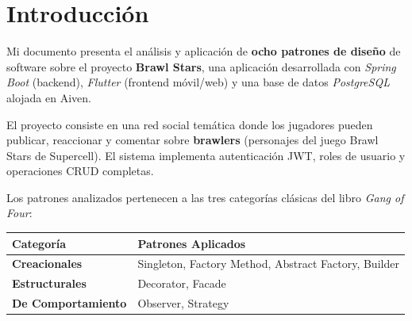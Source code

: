 \documentclass[12pt,a4paper]{article}
\begin{document}
\section{Introducci\'on}

\begin{tcolorbox}[colback=bsDark!8, colframe=bsDark, arc=4pt]
Mi documento presenta el an\'alisis y aplicaci\'on de \textbf{ocho patrones de dise\~no} de software sobre el proyecto \textbf{Brawl Stars}, una aplicaci\'on desarrollada con \textit{Spring Boot} (backend), \textit{Flutter} (frontend m\'ovil/web) y una base de datos \textit{PostgreSQL} alojada en Aiven.
\end{tcolorbox}

\vspace{0.5cm}

El proyecto consiste en una red social tem\'atica donde los jugadores pueden publicar, reaccionar y comentar sobre \textbf{brawlers} (personajes del juego Brawl Stars de Supercell). El sistema implementa autenticaci\'on JWT, roles de usuario y operaciones CRUD completas.

\begin{center}
\end{center}

\vspace{0.5cm}

Los patrones analizados pertenecen a las tres categor\'ias cl\'asicas del libro \textit{Gang of Four}:

\begin{center}
\begin{tabular}{|>{\centering\bfseries}p{3.5cm}|p{8cm}|}
\hline
\rowcolor{bsDark!15} Categor\'ia & Patrones Aplicados \\
\hline
\textcolor{bsGreen}{Creacionales} & Singleton, Factory Method, Abstract Factory, Builder \\
\hline
\textcolor{bsBlue}{Estructurales} & Decorator, Facade \\
\hline
\textcolor{bsPurple}{De Comportamiento} & Observer, Strategy \\
\hline
\end{tabular}
\end{center}
\end{document}
